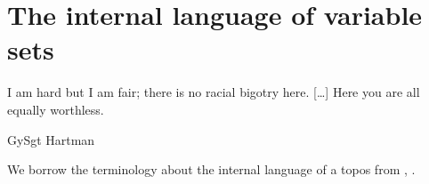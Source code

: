 \section{The internal language of variable sets}\label{int_lang}
\epigraph{I am hard but I am fair; there is no racial bigotry here. [\dots\unkern] Here you are all equally worthless.}{GySgt Hartman}
We borrow the terminology about the internal language of a topos from \cite[VI]{mac1992sheaves}, \cite{lambek1988introduction,JohnstonePT}.
